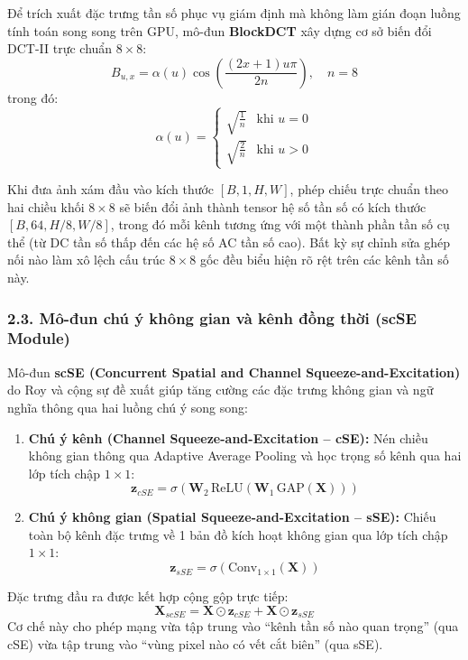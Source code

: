 Để trích xuất đặc trưng tần số phục vụ giám định mà không làm gián đoạn luồng tính toán song song trên GPU, mô-đun \textbf{BlockDCT} xây dựng cơ sở biến đổi DCT-II trực chuẩn $8 \times 8$:
\begin{equation}
B_{u, x} = \alpha(u) \cos \left( \frac{(2x + 1)u\pi}{2n} \right), \quad n=8
\end{equation}
trong đó:
\begin{equation}
\alpha(u) = \begin{cases}
\sqrt{\frac{1}{n}} & \text{khi } u = 0 \\
\sqrt{\frac{2}{n}} & \text{khi } u > 0
\end{cases}
\end{equation}

Khi đưa ảnh xám đầu vào kích thước $[B, 1, H, W]$, phép chiếu trực chuẩn theo hai chiều khối $8 \times 8$ sẽ biến đổi ảnh thành tensor hệ số tần số có kích thước $[B, 64, H/8, W/8]$, trong đó mỗi kênh tương ứng với một thành phần tần số cụ thể (từ DC tần số thấp đến các hệ số AC tần số cao). Bất kỳ sự chỉnh sửa ghép nối nào làm xô lệch cấu trúc $8 \times 8$ gốc đều biểu hiện rõ rệt trên các kênh tần số này.

\subsubsection{2.3. Mô-đun chú ý không gian và kênh đồng thời (scSE Module)}
\indent\indent Mô-đun \textbf{scSE (Concurrent Spatial and Channel Squeeze-and-Excitation)} do Roy và cộng sự \cite{roy2018concurrent} đề xuất giúp tăng cường các đặc trưng không gian và ngữ nghĩa thông qua hai luồng chú ý song song:
\begin{enumerate}
    \item \textbf{Chú ý kênh (Channel Squeeze-and-Excitation -- cSE):} Nén chiều không gian thông qua Adaptive Average Pooling và học trọng số kênh qua hai lớp tích chập $1 \times 1$:
    \begin{equation}
    \mathbf{z}_{cSE} = \sigma \left( \mathbf{W}_2 \, \text{ReLU}(\mathbf{W}_1 \, \text{GAP}(\mathbf{X})) \right)
    \end{equation}
    \item \textbf{Chú ý không gian (Spatial Squeeze-and-Excitation -- sSE):} Chiếu toàn bộ kênh đặc trưng về 1 bản đồ kích hoạt không gian qua lớp tích chập $1 \times 1$:
    \begin{equation}
    \mathbf{z}_{sSE} = \sigma \left( \text{Conv}_{1 \times 1}(\mathbf{X}) \right)
    \end{equation}
\end{enumerate}
Đặc trưng đầu ra được kết hợp cộng gộp trực tiếp:
\begin{equation}
\mathbf{X}_{scSE} = \mathbf{X} \odot \mathbf{z}_{cSE} + \mathbf{X} \odot \mathbf{z}_{sSE}
\end{equation}
Cơ chế này cho phép mạng vừa tập trung vào ``kênh tần số nào quan trọng'' (qua cSE) vừa tập trung vào ``vùng pixel nào có vết cắt biên'' (qua sSE).

